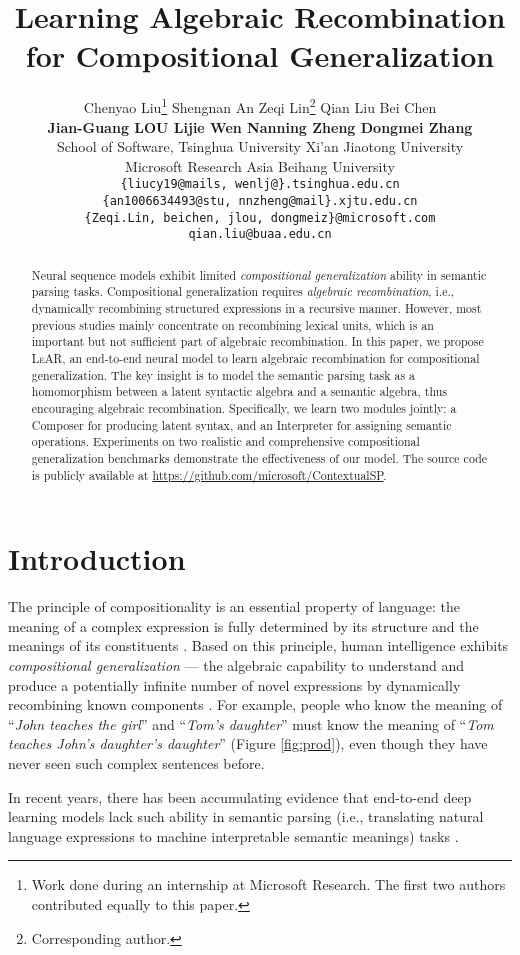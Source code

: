 \documentclass[11pt,a4paper]{article}
\title{Learning Algebraic Recombination for Compositional Generalization}
\author{
  Chenyao Liu\thanks{\quad Work done during an internship at Microsoft Research. The first two authors contributed equally to this paper.} \quad Shengnan An \quad Zeqi Lin\thanks{\quad Corresponding author.} \quad Qian Liu \quad Bei Chen \\
  \textbf{ \quad Jian-Guang LOU  \quad Lijie Wen \quad Nanning Zheng  \quad Dongmei Zhang}\\
  
   School of Software, Tsinghua University \quad  Xi'an Jiaotong University\\
   Microsoft Research Asia \quad  Beihang University\\
  \texttt{\{liucy19@mails, wenlj@\}.tsinghua.edu.cn} \\
  \texttt{\{an1006634493@stu, nnzheng@mail\}.xjtu.edu.cn} \\
  \texttt{\{Zeqi.Lin, beichen, jlou, dongmeiz\}@microsoft.com} \\
  \texttt{qian.liu@buaa.edu.cn} 
}
\date{}
\begin{document}
\maketitle
\begin{abstract}
Neural sequence models exhibit limited \emph{compositional generalization} ability in semantic parsing tasks. Compositional generalization requires \emph{algebraic recombination}, i.e., dynamically recombining structured expressions in a recursive manner.
However, most previous studies mainly concentrate on recombining lexical units, which is an important but not sufficient part of algebraic recombination.
In this paper, we propose \textsc{LeAR}, an end-to-end neural model to learn algebraic recombination for compositional generalization.
The key insight is to model the semantic parsing task as a homomorphism between a latent syntactic algebra and a semantic algebra, thus encouraging algebraic recombination.
Specifically, we learn two modules jointly: a Composer for producing latent syntax, and an Interpreter for assigning semantic operations.
Experiments on two realistic and comprehensive compositional generalization benchmarks demonstrate the effectiveness of our model.
The source code is publicly available at \href{https://github.com/microsoft/ContextualSP}{https://github.com/microsoft/ContextualSP}.
\end{abstract}

\section{Introduction}

The principle of compositionality is an essential property of language: the meaning of a complex expression is fully determined by its structure and the meanings of its constituents \cite{pelletier2003context-tpoc, szabo2004compositionality-tpoc}.
Based on this principle, human intelligence exhibits \textit{compositional generalization} --- the algebraic capability to understand and produce a potentially infinite number of novel expressions by dynamically recombining known components \cite{chomsky1957syntactic-hicg, fodor_connectionism_1988-hicg, fodor2002compositionality-hicg}.
For example, people who know the meaning of ``\textit{John teaches the girl}'' and ``\textit{Tom's daughter}'' must know the meaning of
``\textit{Tom teaches John's daughter's daughter}'' (Figure \ref{fig:prod}), even though they have never seen such complex sentences before.

In recent years, there has been accumulating evidence that end-to-end deep learning models lack such ability in semantic parsing (i.e., translating natural language expressions to machine interpretable semantic meanings) tasks \cite{lake2018scan, keysers2019measuring, kim2020cogs, tsarkov2020cfq-lcg}.
\end{document}
